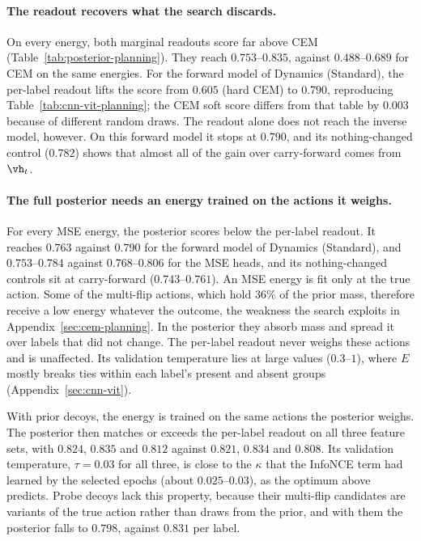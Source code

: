 \paragraph{The readout recovers what the search discards.} On every energy, both marginal readouts score far above CEM (Table~\ref{tab:posterior-planning}). They reach $0.753$--$0.835$, against $0.488$--$0.689$ for CEM on the same energies. For the forward model of Dynamics (Standard), the per-label readout lifts the score from $0.605$ (hard CEM) to $0.790$, reproducing Table~\ref{tab:cnn-vit-planning}; the CEM soft score differs from that table by $0.003$ because of different random draws. The readout alone does not reach the inverse model, however. On this forward model it stops at $0.790$, and its nothing-changed control ($0.782$) shows that almost all of the gain over carry-forward comes from $\vh_t$.

\paragraph{The full posterior needs an energy trained on the actions it weighs.} For every MSE energy, the posterior scores below the per-label readout. It reaches $0.763$ against $0.790$ for the forward model of Dynamics (Standard), and $0.753$--$0.784$ against $0.768$--$0.806$ for the MSE heads, and its nothing-changed controls sit at carry-forward ($0.743$--$0.761$). An MSE energy is fit only at the true action. Some of the multi-flip actions, which hold $36\%$ of the prior mass, therefore receive a low energy whatever the outcome, the weakness the search exploits in Appendix~\ref{sec:cem-planning}. In the posterior they absorb mass and spread it over labels that did not change. The per-label readout never weighs these actions and is unaffected. Its validation temperature lies at large values ($0.3$--$1$), where $E$ mostly breaks ties within each label's present and absent groups (Appendix~\ref{sec:cnn-vit}).

With prior decoys, the energy is trained on the same actions the posterior weighs. The posterior then matches or exceeds the per-label readout on all three feature sets, with $0.824$, $0.835$ and $0.812$ against $0.821$, $0.834$ and $0.808$. Its validation temperature, $\tau=0.03$ for all three, is close to the $\kappa$ that the InfoNCE term had learned by the selected epochs (about $0.025$--$0.03$), as the optimum above predicts. Probe decoys lack this property, because their multi-flip candidates are variants of the true action rather than draws from the prior, and with them the posterior falls to $0.798$, against $0.831$ per label.

